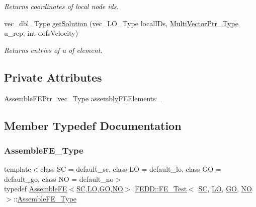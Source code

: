 \begin{DoxyCompactItemize}
\begin{DoxyCompactList}\small\item\em Returns coordinates of local node ids. \end{DoxyCompactList}\item 
vec\+\_\+dbl\+\_\+\+Type \hyperlink{classFEDD_1_1FE__Test_af91b8a8834bd9e3a8e7f2893e353a212}{get\+Solution} (vec\+\_\+\+L\+O\+\_\+\+Type local\+I\+Ds, \hyperlink{classFEDD_1_1FE__Test_ac7c0363aa74e0bfcb903c13330c50185}{Multi\+Vector\+Ptr\+\_\+\+Type} u\+\_\+rep, int dofs\+Velocity)
\begin{DoxyCompactList}\small\item\em Returns entries of u of element. \end{DoxyCompactList}\end{DoxyCompactItemize}
\subsection*{Private Attributes}
\begin{DoxyCompactItemize}
\item 
\hyperlink{classFEDD_1_1FE__Test_a7c6207bb2e578ea92dbfb20aa766e2d3}{Assemble\+F\+E\+Ptr\+\_\+vec\+\_\+\+Type} \hyperlink{classFEDD_1_1FE__Test_a8456e72f910449b1eea6883291d2cda0}{assembly\+F\+E\+Elements\+\_\+}
\end{DoxyCompactItemize}


\subsection{Member Typedef Documentation}
\mbox{\label{classFEDD_1_1FE__Test_afbc20c921480ce9f89ec045f94f6806a}} 
\subsubsection{\texorpdfstring{Assemble\+F\+E\+\_\+\+Type}{AssembleFE\_Type}}
{\footnotesize\ttfamily template$<$class SC  = default\+\_\+sc, class LO  = default\+\_\+lo, class GO  = default\+\_\+go, class NO  = default\+\_\+no$>$ \\
typedef \hyperlink{classFEDD_1_1AssembleFE}{Assemble\+FE}$<$\hyperlink{fe__test__laplace_8cpp_a79c7e86a57edbb2a5a53242bcd04e41e}{SC},\hyperlink{fe__test__laplace_8cpp_ad6a38c9f07d3fd633eefca5bccad8410}{LO},\hyperlink{fe__test__laplace_8cpp_afa2946b509009b4f45eb04bd8c5b27d9}{GO},\hyperlink{fe__test__laplace_8cpp_a5e24f37b28787429872b6ecb1d0417ce}{NO}$>$ \hyperlink{classFEDD_1_1FE__Test}{F\+E\+D\+D\+::\+F\+E\+\_\+\+Test}$<$ \hyperlink{fe__test__laplace_8cpp_a79c7e86a57edbb2a5a53242bcd04e41e}{SC}, \hyperlink{fe__test__laplace_8cpp_ad6a38c9f07d3fd633eefca5bccad8410}{LO}, \hyperlink{fe__test__laplace_8cpp_afa2946b509009b4f45eb04bd8c5b27d9}{GO}, \hyperlink{fe__test__laplace_8cpp_a5e24f37b28787429872b6ecb1d0417ce}{NO} $>$\+::\hyperlink{classFEDD_1_1FE__Test_afbc20c921480ce9f89ec045f94f6806a}{Assemble\+F\+E\+\_\+\+Type}}

